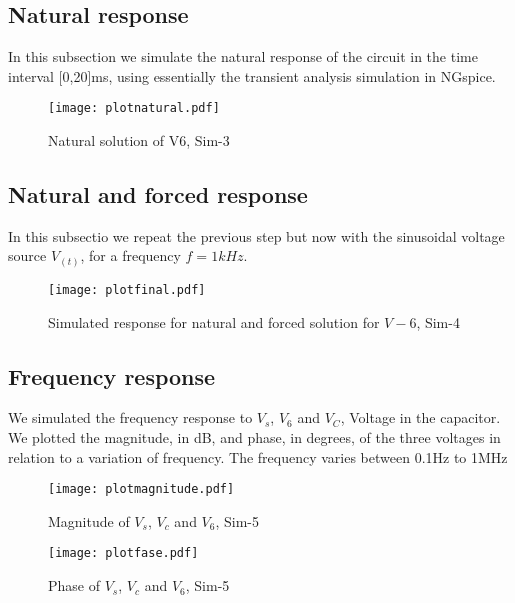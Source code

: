 \subsection{Natural response}
In this subsection we simulate the natural response of the circuit in the time interval [0,20]ms, using essentially the transient analysis simulation in NGspice. 

\FloatBarrier
\begin{figure}[h] \centering
\texttt{[image: plotnatural.pdf]}
\caption{Natural solution of V6, Sim-3}
\label{fig:plotnatural}
\end{figure}
\FloatBarrier

\subsection{Natural and forced response} 

In this subsectio we repeat the previous step but now with the sinusoidal voltage source $V_(t)$, for a frequency $f=1kHz$. 

\FloatBarrier
\begin{figure}[h] \centering
\texttt{[image: plotfinal.pdf]}
\caption{Simulated response for natural and forced solution for $V-6$, Sim-4}
\label{fig:plotfinal}
\end{figure}
\FloatBarrier 

\subsection{Frequency response} 

We simulated the frequency response to $V_s$, $V_6$ and $V_C$, Voltage in the capacitor. We plotted the magnitude, in dB, and phase, in degrees, of the three voltages in relation to a variation of frequency. The frequency varies between 0.1Hz to 1MHz 

\FloatBarrier
\begin{figure}[h] \centering
\texttt{[image: plotmagnitude.pdf]}
\caption{Magnitude of $V_s$, $V_c$ and $V_6$, Sim-5 }
\label{fig:plotmagnitude}
\end{figure}
\FloatBarrier  

\FloatBarrier
\begin{figure}[h] \centering
\texttt{[image: plotfase.pdf]}
\caption{Phase of $V_s$, $V_c$ and $V_6$, Sim-5}
\label{fig:plotfase}
\end{figure}
\FloatBarrier 


%    


